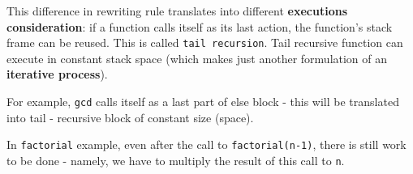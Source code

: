 \documentclass{scrartcl}
\newcommand{\term}[1]{\verb~#1~} %
\begin{document}
This difference in rewriting rule translates into different {\bf executions
  consideration}: if a function calls itself as its last action, the function's
stack frame can be reused. This is called \term{tail recursion}. Tail recursive
function can execute in constant stack space (which makes just another
formulation of an {\bf iterative process}). 

For example, \lstinline|gcd| calls itself as a last part of else block - this
will be translated into tail - recursive block of constant size (space). 

In \lstinline|factorial| example, even after the call to
\lstinline|factorial(n-1)|, there is still work to be done - namely, we have to
multiply the result of this call to \lstinline|n|.
\end{document}

